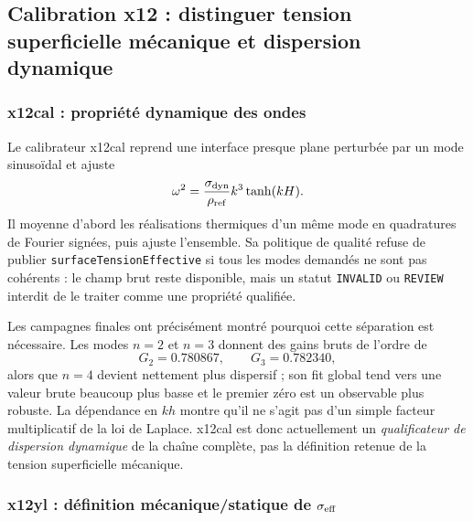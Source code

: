 \documentclass[11pt,a4paper]{article}
\begin{document}
\subsection{Calibration x12 : distinguer tension superficielle mécanique et dispersion dynamique}

\subsubsection{x12cal : propriété dynamique des ondes}

Le calibrateur x12cal reprend une interface presque plane perturbée par un mode sinusoïdal et ajuste
\begin{equation}
  \omega^2
  =
  \frac{\sigma_{\rm dyn}}{\rho_{\rm ref}}
  k^3\tanh(kH).
  \label{eq:x12cal_dispersion}
\end{equation}
Il moyenne d'abord les réalisations thermiques d'un même mode en quadratures de Fourier signées, puis ajuste l'ensemble. Sa politique de qualité refuse de publier \texttt{surfaceTensionEffective} si tous les modes demandés ne sont pas cohérents : le champ brut reste disponible, mais un statut \texttt{INVALID} ou \texttt{REVIEW} interdit de le traiter comme une propriété qualifiée.

Les campagnes finales ont précisément montré pourquoi cette séparation est nécessaire. Les modes $n=2$ et $n=3$ donnent des gains bruts de l'ordre de
\[
  G_2=0.780867,\qquad
  G_3=0.782340,
\]
alors que $n=4$ devient nettement plus dispersif ; son fit global tend vers une valeur brute beaucoup plus basse et le premier zéro est un observable plus robuste. La dépendance en $kh$ montre qu'il ne s'agit pas d'un simple facteur multiplicatif de la loi de Laplace. x12cal est donc actuellement un \emph{qualificateur de dispersion dynamique} de la chaîne complète, pas la définition retenue de la tension superficielle mécanique.

\subsubsection{x12yl : définition mécanique/statique de \texorpdfstring{$\sigma_{\rm eff}$}{sigmaeff}}
\end{document}
